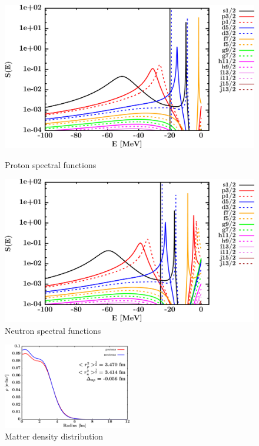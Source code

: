 \begin{figure}[H]
    \centering
    \begin{minipage}{0.45\textwidth}
        \centering
        \includegraphics[width=1.0\textwidth]{figures/ca40_protonSpectralFunctions.png}
        \caption{Proton spectral functions}
        \label{DOMFitData_ca40_proton_spectralFunctions}
    \end{minipage}\hfill
    \begin{minipage}{0.45\textwidth}
        \centering
        \includegraphics[width=1.0\textwidth]{figures/ca40_neutronSpectralFunctions.png}
        \caption{Neutron spectral functions}
        \label{DOMFitData_ca40_neutron_spectralFunctions}
    \end{minipage}
\end{figure}

\begin{figure}[H]
    \centering
    \includegraphics[width = 0.5\textwidth]{figures/ca40_matterDensity.png}
    \caption{Matter density distribution}
    \label{DOMFitData_ca40_matterDensity}
\end{figure}


